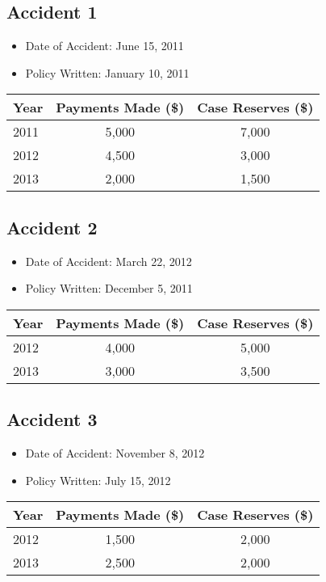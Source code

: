 \documentclass{article}
\begin{document}
\begin{enumerate}
\subsection*{Accident 1}
\begin{itemize}
       \item Date of Accident: June 15, 2011
        \item Policy Written: January 10, 2011
\end{itemize}
\begin{tabular}{lcc}
\toprule
Year & Payments Made (\$) & Case Reserves (\$) \\
\midrule
2011 & 5,000 & 7,000 \\
2012 & 4,500 & 3,000 \\
2013 & 2,000 & 1,500 \\
\bottomrule
\end{tabular}

\subsection*{Accident 2}
\begin{itemize}
       \item Date of Accident: March 22, 2012
        \item Policy Written: December 5, 2011
\end{itemize}
\begin{tabular}{lcc}
\toprule
Year & Payments Made (\$) & Case Reserves (\$) \\
\midrule
2012 & 4,000 & 5,000 \\
2013 & 3,000 & 3,500 \\
\bottomrule
\end{tabular}

\subsection*{Accident 3}
\begin{itemize}
        \item Date of Accident: November 8, 2012
        \item Policy Written: July 15, 2012
\end{itemize}
\begin{tabular}{lcc}
\toprule
Year & Payments Made (\$) & Case Reserves (\$) \\
\midrule
2012 & 1,500 & 2,000 \\
2013 & 2,500 & 2,000 \\
\bottomrule
\end{tabular}


\end{enumerate}
\end{document}

